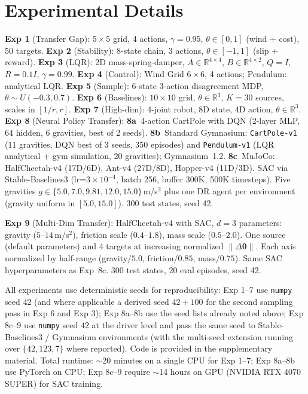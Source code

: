 \documentclass{article}
\newcommand{\thetavec}{\boldsymbol{\theta}}
\newcommand{\R}{\mathbb{R}}
\begin{document}
\section{Experimental Details}
\label{app:exp-details}

\textbf{Exp 1} (Transfer Gap): $5\times5$ grid, 4 actions, $\gamma=0.95$, $\theta \in [0,1]$ (wind + cost), 50 targets.
\textbf{Exp 2} (Stability): 8-state chain, 3 actions, $\theta \in [-1,1]$ (slip + reward).
\textbf{Exp 3} (LQR): 2D mass-spring-damper, $A \in \R^{4\times4}$, $B \in \R^{4\times2}$, $Q=I$, $R=0.1I$, $\gamma=0.99$.
\textbf{Exp 4} (Control): Wind Grid $6\times6$, 4 actions; Pendulum: analytical LQR.
\textbf{Exp 5} (Sample): 6-state 3-action disagreement MDP, $\theta \sim U(-0.3, 0.7)$.
\textbf{Exp 6} (Baselines): $10\times10$ grid, $\theta \in \R^3$, $K=30$ sources, scales in $[1/r, r]$.
\textbf{Exp 7} (High-dim): 4-joint robot, 8D state, 4D action, $\theta \in \R^3$.
\textbf{Exp 8} (Neural Policy Transfer): \textbf{8a}~4-action CartPole with DQN (2-layer MLP, 64 hidden, 6 gravities, best of 2 seeds). \textbf{8b}~Standard Gymnasium: \texttt{CartPole-v1} (11 gravities, DQN best of 3 seeds, 350 episodes) and \texttt{Pendulum-v1} (LQR analytical + gym simulation, 20 gravities); Gymnasium~1.2. \textbf{8c}~MuJoCo: HalfCheetah-v4 (17D/6D), Ant-v4 (27D/8D), Hopper-v4 (11D/3D). SAC via Stable-Baselines3 (lr=$3\!\times\!10^{-4}$, batch 256, buffer 300K, 500K timesteps). Five gravities $g \in \{5.0, 7.0, 9.81, 12.0, 15.0\}$\,m/s$^2$ plus one DR agent per environment (gravity uniform in $[5.0, 15.0]$). 300 test states, seed 42.

\textbf{Exp 9} (Multi-Dim Transfer): HalfCheetah-v4 with SAC, $d=3$ parameters: gravity ($5$--$14$\,m/s$^2$), friction scale ($0.4$--$1.8$), mass scale ($0.5$--$2.0$). One source (default parameters) and 4 targets at increasing normalized $\|\Delta\thetavec\|$. Each axis normalized by half-range (gravity$/5.0$, friction$/0.85$, mass$/0.75$). Same SAC hyperparameters as Exp~8c. 300 test states, 20 eval episodes, seed 42.

All experiments use deterministic seeds for reproducibility: Exp 1--7 use \texttt{numpy} seed $42$ (and where applicable a derived seed $42{+}100$ for the second sampling pass in Exp 6 and Exp 3); Exp 8a--8b use the seed lists already noted above; Exp 8c--9 use \texttt{numpy} seed $42$ at the driver level and pass the same seed to Stable-Baselines3 / Gymnasium environments (with the multi-seed extension running over $\{42, 123, 7\}$ where reported). Code is provided in the supplementary material. Total runtime: $\sim$20 minutes on a single CPU for Exp 1--7; Exp 8a--8b use PyTorch on CPU; Exp 8c--9 require $\sim$14 hours on GPU (NVIDIA RTX 4070 SUPER) for SAC training.
\end{document}
